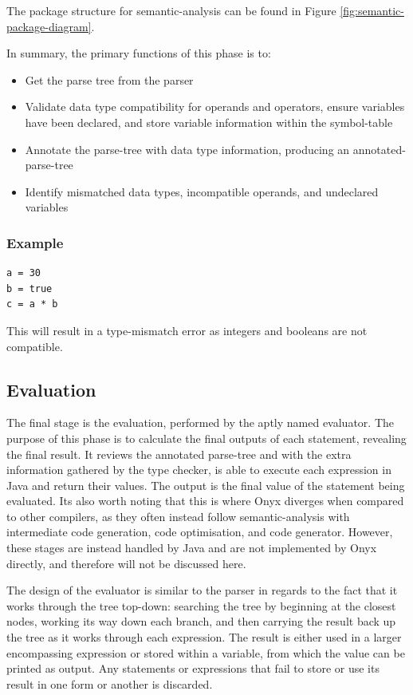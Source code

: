 \documentclass[
]{report}
\begin{document}
The package structure for \gls{semantic-analysis} can be found in Figure \ref{fig:semantic-package-diagram}.

In summary, the primary functions of this phase is to: 
\begin{itemize}
	\item Get the parse tree from the parser
	\item Validate data type compatibility for operands and operators, ensure variables have been declared, and store variable information within the \gls{symbol-table}
	\item Annotate the \gls{parse-tree} with data type information, producing an \gls{annotated-parse-tree}
	\item Identify mismatched data types, incompatible operands, and undeclared variables
\end{itemize}

\subsubsection{Example}
\begin{verbatim}
a = 30
b = true
c = a * b
\end{verbatim}
This will result in a type-mismatch error as integers and 
booleans are not compatible.

\subsection{Evaluation}
The final stage is the evaluation, performed by the aptly named
evaluator. The purpose of this phase is to calculate the final outputs
of each \gls{statement}, revealing the final result. It reviews the annotated
\gls{parse-tree} and with the extra information gathered by the type checker,
is able to execute each \gls{expression} in Java and return their values. The
output is the final value of the \gls{statement} being evaluated. Its also
worth noting that this is where Onyx diverges when compared to other
compilers, as they often instead follow \gls{semantic-analysis} with
intermediate code generation, code optimisation, and code generator.
However, these stages are instead handled by Java and are not
implemented by Onyx directly, and therefore will not be discussed here.

The design of the evaluator is similar to the parser in regards to the
fact that it works through the tree top-down: searching the tree by
beginning at the closest nodes, working its way down each branch, and
then carrying the result back up the tree as it works through each
\gls{expression}. The result is either used in a larger encompassing
\gls{expression} or stored within a variable, from which the value can be
printed as output. Any \glspl{statement} or \glspl{expression} that fail to store or
use its result in one form or another is discarded.
\end{document}
